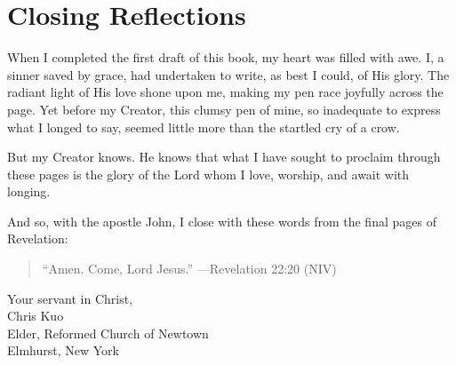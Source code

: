 \section*{Closing Reflections}

When I completed the first draft of this book, my heart was filled with awe. I, a sinner saved by grace, had undertaken to write, as best I could, of His glory. The radiant light of His love shone upon me, making my pen race joyfully across the page. Yet before my Creator, this clumsy pen of mine, so inadequate to express what I longed to say, seemed little more than the startled cry of a crow.

But my Creator knows. He knows that what I have sought to proclaim through these pages is the glory of the Lord whom I love, worship, and await with longing.

And so, with the apostle John, I close with these words from the final pages of Revelation:

\begin{quote}
``Amen. Come, Lord Jesus.''
---Revelation 22:20 (NIV)
\end{quote}

\vspace{2em}

\begin{flushright}
Your servant in Christ,\\
Chris Kuo\\
Elder, Reformed Church of Newtown\\
Elmhurst, New York
\end{flushright}
